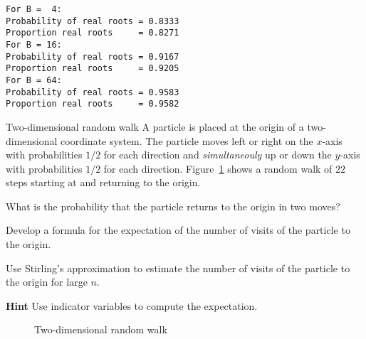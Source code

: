 \sml{}
\begin{verbatim}
For B =  4:
Probability of real roots = 0.8333
Proportion real roots     = 0.8271
For B = 16:
Probability of real roots = 0.9167
Proportion real roots     = 0.9205
For B = 64:
Probability of real roots = 0.9583
Proportion real roots     = 0.9582
\end{verbatim}


\begin{prob}{Two-dimensional random walk}
A particle is placed at the origin of a two-dimensional coordinate system. The particle moves left or right on the $x$-axis with probabilities $1/2$ for each direction and \emph{simultaneouly} up or down the $y$-axis with probabilities $1/2$ for each direction. Figure~\ref{f.2d-random-walk} shows a random walk of $22$ steps starting at and returning to the origin.

 What is the probability that the particle returns to the origin in two moves?

 Develop a formula for the expectation of the number of visits of the particle to the origin.

 Use Stirling's approximation to estimate the number of visits of the particle to the origin for large $n$.

\textbf{Hint} Use indicator variables to compute the expectation.

\begin{figure}[t]
\begin{center}
\end{center}
\caption{Two-dimensional random walk}\label{f.2d-random-walk}
\end{figure}
\end{prob}

